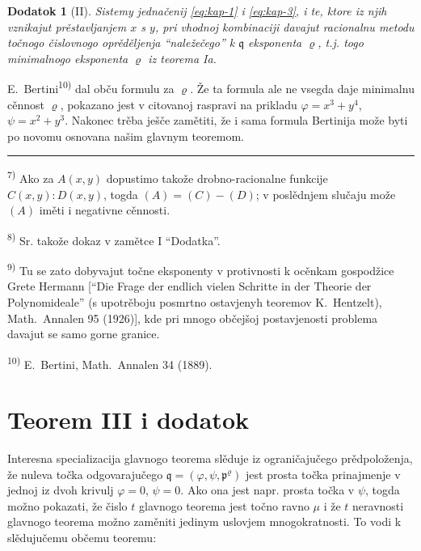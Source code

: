 \documentclass[11pt]{article}
\newcommand{\foreign}[1]{#1}
\theoremstyle{plain}
\newtheorem{zusatz}{Dodatok}
\begin{document}
\begin{zusatz}[II]
Sistemy jednačenij \eqref{eq:kap-1} i \eqref{eq:kap-3}, i te, ktore
iz njih vznikajut prěstavljanjem $x$ s $y$, pri vhodnoj kombinaciji
davajut racionalnu metodu točnogo čislovnogo oprěděljenja
``naležečego'' k $\mathfrak{q}$ eksponenta
$\varrho$, t.j. togo minimalnogo eksponenta $\varrho$ iz teorema Ia.
\end{zusatz}

E.\ Bertini\textsuperscript{10)} dal obču formulu za $\varrho$.
Že ta formula ale ne vsegda daje minimalnu cěnnost $\varrho$,
pokazano jest v citovanoj raspravi na prikladu
$\varphi = x^{3} + y^{4}$, $\psi = x^{2} + y^{3}$. Nakonec trěba
ješče zamětiti, že i sama formula Bertinija može byti po novomu
osnovana našim glavnym teoremom.

\vspace{0.5em}
\noindent\rule{\textwidth}{0.4pt}
\vspace{0.3em}

{\footnotesize
\textsuperscript{7)} Ako za $A(x,y)$ dopustimo takože drobno-racionalne
funkcije $C(x,y):D(x,y)$, togda $(A) = (C) - (D)$; v poslědnjem
slučaju može $(A)$ iměti i negativne cěnnosti.

\textsuperscript{8)} Sr. takože dokaz v zamětce I ``Dodatka''.

\textsuperscript{9)} Tu se zato dobyvajut točne eksponenty v protivnosti k
ocěnkam gospodžice Grete Hermann [``\foreign{Die Frage der endlich vielen Schritte
in der Theorie der Polynomideale}'' (s upotrěboju posmrtno ostavjenyh
teoremov K.\ Hentzelt), \foreign{Math.\ Annalen} 95 (1926)], kde pri
mnogo občejšoj postavjenosti problema davajut se samo gorne granice.

\textsuperscript{10)} E.\ Bertini, \foreign{Math.\ Annalen} 34 (1889).
}

\newpage
\section*{Teorem III i dodatok}

Interesna specializacija glavnogo teorema slěduje iz ograničajučego
prědpoloženja, že nuleva točka odgovarajučego
$\mathfrak{q} = (\varphi, \psi, \mathfrak{p}^\varrho)$ jest prosta
točka prinajmenje v jednoj iz dvoh krivulj $\varphi = 0$, $\psi = 0$.
Ako ona jest napr. prosta točka v $\psi$, togda možno pokazati, že
čislo $t$ glavnogo teorema jest točno ravno $\mu$ i že $t$
neravnosti glavnogo teorema možno zaměniti jedinym uslovjem
mnogokratnosti. To vodi k slědujučemu občemu teoremu:
\end{document}
